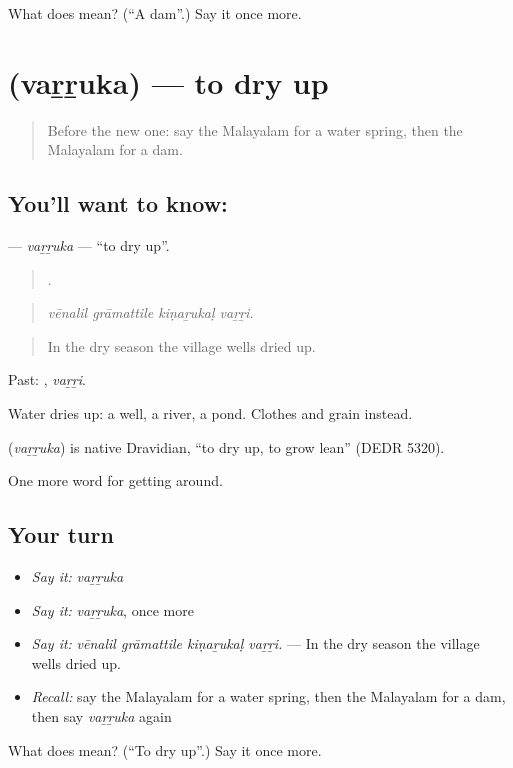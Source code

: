 \begin{tcolorbox}[breakable,colback=teal!4,colframe=teal!35!black,title={Before you move on}]
What does  mean? (\textquotedblleft{}A dam\textquotedblright{}.) Say it once more.
\end{tcolorbox}
\section[\texorpdfstring{\ml{വറ്റുക} (vaṟṟuka)}{വറ്റുക (vaṟṟuka)}]{ (vaṟṟuka) — to dry up}

\label{lesson:ML-C496-varruka}



\begin{quote}
Before the new one: say the Malayalam for a water spring, then the Malayalam for a dam.
\end{quote}

\subsection*{You'll want to know: }
\textbf{} — \emph{vaṟṟuka} — \textquotedblleft{}to dry up\textquotedblright{}.

\begin{quote}
   .
\end{quote}

\begin{quote}
\emph{vēnalil grāmattile kiṇaṟukaḷ vaṟṟi.}
\end{quote}

\begin{quote}
In the dry season the village wells dried up.
\end{quote}

Past: , \emph{vaṟṟi}.

Water dries up: a well, a river, a pond. Clothes and grain  instead.

\begin{cousinweb}
\textbf{} (\emph{vaṟṟuka}) is native Dravidian, \textquotedblleft{}to dry up, to grow lean\textquotedblright{} (DEDR 5320).
\end{cousinweb}

\begin{grammarlens}[title={What you've built}]
One more word for getting around.
\end{grammarlens}

\subsection*{Your turn}
\begin{itemize}
\raggedright
  \item \emph{Say it:} \emph{vaṟṟuka}
  \item \emph{Say it:} \emph{vaṟṟuka}, once more
  \item \emph{Say it:} \emph{vēnalil grāmattile kiṇaṟukaḷ vaṟṟi.} — In the dry season the village wells dried up.
  \item \emph{Recall:} say the Malayalam for a water spring, then the Malayalam for a dam, then say \emph{vaṟṟuka} again
\end{itemize}

\begin{tcolorbox}[breakable,colback=teal!4,colframe=teal!35!black,title={Before you move on}]
What does  mean? (\textquotedblleft{}To dry up\textquotedblright{}.) Say it once more.
\end{tcolorbox}
